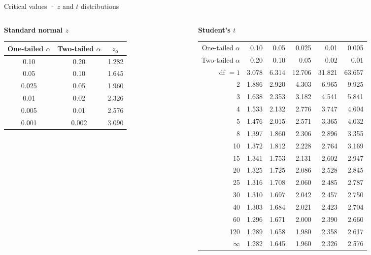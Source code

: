 \documentclass[
  11pt,
  ignorenonframetext,
  aspectratio=169,
]{beamer}
\renewcommand{\arraystretch}{1.25}
\begin{document}
\begin{frame}[shrink=5]{Critical values · \(z\) and \(t\) distributions}
\protect{}\label{critical-values-z-and-t}
\begin{columns}[T]
\begin{column}{0.33\textwidth}
\centering
\textbf{Standard normal \(z\)}\\[0.4em]
\footnotesize
\begin{tabular}{@{}ccc@{}}
\toprule
One-tailed \(\alpha\) & Two-tailed \(\alpha\) & \(z_\alpha\) \\
\midrule
0.10  & 0.20  & 1.282 \\
0.05  & 0.10  & 1.645 \\
0.025 & 0.05  & 1.960 \\
0.01  & 0.02  & 2.326 \\
0.005 & 0.01  & 2.576 \\
0.001 & 0.002 & 3.090 \\
\bottomrule
\end{tabular}
\end{column}

\begin{column}{0.63\textwidth}
\centering
\textbf{Student's \(t\)}\\[0.4em]
\scriptsize
\renewcommand{\arraystretch}{0.95}
\begin{tabular}{@{}r*{5}{r}@{}}
\toprule
One-tailed \(\alpha\) & 0.10 & 0.05 & 0.025 & 0.01 & 0.005 \\
Two-tailed \(\alpha\) & 0.20 & 0.10 & 0.05  & 0.02 & 0.01  \\
\midrule
df \(=1\) & 3.078 & 6.314 & 12.706 & 31.821 & 63.657 \\
2        & 1.886 & 2.920 & 4.303  & 6.965  & 9.925  \\
3        & 1.638 & 2.353 & 3.182  & 4.541  & 5.841  \\
4        & 1.533 & 2.132 & 2.776  & 3.747  & 4.604  \\
5        & 1.476 & 2.015 & 2.571  & 3.365  & 4.032  \\
8        & 1.397 & 1.860 & 2.306  & 2.896  & 3.355  \\
10       & 1.372 & 1.812 & 2.228  & 2.764  & 3.169  \\
15       & 1.341 & 1.753 & 2.131  & 2.602  & 2.947  \\
20       & 1.325 & 1.725 & 2.086  & 2.528  & 2.845  \\
25       & 1.316 & 1.708 & 2.060  & 2.485  & 2.787  \\
30       & 1.310 & 1.697 & 2.042  & 2.457  & 2.750  \\
40       & 1.303 & 1.684 & 2.021  & 2.423  & 2.704  \\
60       & 1.296 & 1.671 & 2.000  & 2.390  & 2.660  \\
120      & 1.289 & 1.658 & 1.980  & 2.358  & 2.617  \\
\midrule
\(\infty\) & 1.282 & 1.645 & 1.960 & 2.326 & 2.576 \\
\bottomrule
\end{tabular}
\end{column}
\end{columns}


\end{frame}
\end{document}
